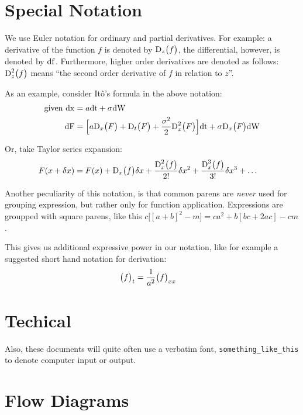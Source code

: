 \documentclass{article}
\begin{document}
\section{Special Notation}
We use Euler notation for ordinary and partial derivatives. For example: a derivative of the function $f$ is denoted by $\df[z]{f}$, the differential, however, is denoted by ${\rm{df}}$. Furthermore, higher order derivatives are denoted as follows: $\ddf[z]{f}$ means ``the second order derivative of $f$ in relation to $z$''.

As an example, consider It\^o's formula in the above notation:
\begin{align*}
	\text{given } \dif{x} &= a\dif{t} + \sigma\dif{W} \\
	\dif{F} &= {\Big[a\df{F} + \df[t]{F} + \frac{\sigma^2}{2}\ddf{F}\Big]
		\dif{t} + \sigma\df{F}\dif{W}}
\end{align*}

Or, take Taylor series expansion:
\begin{align*}
	F(x + \delta{}x) &= {F(x) + \df{f}\delta{}x + 
		\frac{\ddf{f}}{2!} \delta{}x^2 + 
		\frac{\dddf{f}}{3!}\delta{}x^3 + \dots}
\end{align*}

Another peculiarity of this notation, is that common parens are \emph{never} used for
grouping expression, but rather only for function application. Expressions are groupped with square parens, like this $c\big[[a+b]^2 - m\big] = ca^2 + b[bc + 2ac] - cm$.

This gives us additional expressive power in our notation, like for example a suggested short hand notation for derivation:
\begin{align*}
	\ds[t]{f} &= \frac{1}{a^2}\dds{f}
\end{align*}


\section{Techical}

Also, these documents will quite often use a verbatim font, \Verb|something_like_this| to denote computer input or output.


\section{Flow Diagrams}
\end{document}
